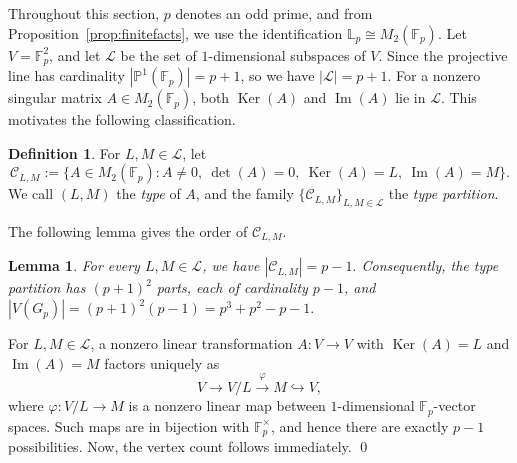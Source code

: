 \documentclass[12pt]{article}
\renewenvironment{proof}{{\bf \noindent Proof.}}{\qed}
\newtheorem{lemma}[theorem]{Lemma}
\theoremstyle{definition}
\newtheorem{definition}[theorem]{Definition}
\newcommand{\F}{\mathbb{F}}
\newcommand{\LL}{\mathbb{L}}
\newcommand{\PP}{\mathbb{P}}
\newcommand{\calL}{\mathcal{L}}
\newcommand{\calC}{\mathcal{C}}
\newcommand{\Ker}{\operatorname{Ker}}
\newcommand{\Image}{\operatorname{Im}}
\begin{document}
	Throughout this section, $p$ denotes an odd prime, and from Proposition~\ref{prop:finitefacts}, we use the identification $\LL_p\cong M_2(\F_p)$. Let $V=\F_p^2$, and let $\calL$ be the set of $1$-dimensional subspaces of $V$. Since the projective line has cardinality $|\PP^1(\F_p)|=p+1$, so we have $|\calL|=p+1$. For a nonzero singular matrix $A\in M_2(\F_p)$, both $\Ker(A)$ and $\Image(A)$ lie in $\calL$. This motivates the following classification.
	
	\begin{definition}
		For $L,M\in \calL$, let
		$$
		\calC_{L,M}:=\{A\in M_2(\F_p): A\neq 0,\ \det(A)=0,\ \Ker(A)=L,\ \Image(A)=M\}.
		$$
		We call $(L,M)$ the \emph{type} of $A$, and the family $\{\calC_{L,M}\}_{L,M\in\calL}$ the \emph{type partition}.
	\end{definition}
	
	\medskip
	The following lemma gives the order of $\calC_{L,M}.$
	\begin{lemma}\label{lem:classsize}
		For every $L,M\in\calL$, we have $|\calC_{L,M}|=p-1.$ Consequently, the type partition has $(p+1)^2$ parts, each of cardinality $p-1$, and $|V(G_p)|=(p+1)^2(p-1)=p^3+p^2-p-1.$ 
	\end{lemma}
	
	\begin{proof}
		For $L,M\in \calL$, a nonzero linear transformation $A:V\to V$ with $\Ker(A)=L$ and $\Image(A)=M$ factors uniquely as
		$$
		V \longrightarrow V/L \xrightarrow{\ \varphi\ } M \hookrightarrow V,
		$$
		where $\varphi:V/L\to M$ is a nonzero linear map between $1$-dimensional $\F_p$-vector spaces. Such maps are in bijection with $\F_p^\times$, and hence there are exactly $p-1$ possibilities. Now, the vertex count follows immediately.
	\end{proof}
	
\end{document}
